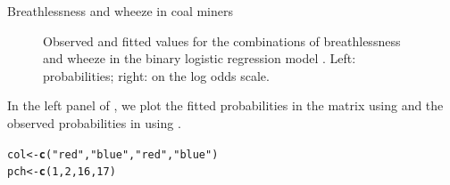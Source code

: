 \documentclass[11pt]{book}\usepackage[]{graphicx}\usepackage[]{color}
\makeatletter
\newcommand{\hlnum}[1]{\textcolor[rgb]{0.686,0.059,0.569}{#1}}%
\newcommand{\hlstr}[1]{\textcolor[rgb]{0.192,0.494,0.8}{#1}}%
\newcommand{\hlstd}[1]{\textcolor[rgb]{0.345,0.345,0.345}{#1}}%
\newcommand{\hlkwb}[1]{\textcolor[rgb]{0.69,0.353,0.396}{#1}}%
\newcommand{\hlkwd}[1]{\textcolor[rgb]{0.737,0.353,0.396}{\textbf{#1}}}%
\newenvironment{kframe}{%
 \def\at@end@of@kframe{}%
 \ifinner\ifhmode%
  \def\at@end@of@kframe{\end{minipage}}%
  \begin{minipage}{\columnwidth}%
 \fi\fi%
 \def\FrameCommand##1{\hskip\@totalleftmargin \hskip-\fboxsep
 \colorbox{shadecolor}{##1}\hskip-\fboxsep
     \hskip-\linewidth \hskip-\@totalleftmargin \hskip\columnwidth}%
 \MakeFramed {\advance\hsize-\width
   \@totalleftmargin\z@ \linewidth\hsize
   \@setminipage}}%
 {\par\unskip\endMakeFramed%
 \at@end@of@kframe}
\newenvironment{knitrout}{}{} %
\renewenvironment{knitrout}{\small\renewcommand{\baselinestretch}{.85}}{} %
\makeatother
\begin{document}
\begin{Example}[coalminers]{Breathlessness and wheeze in coal miners}
\begin{figure}
\caption{Observed and fitted values for the combinations of breathlessness and wheeze in the binary logistic regression model . Left: probabilities; right: on the log odds scale.}
\label{fig:cm-vglm1}
\end{figure}

In the left panel of , we plot the fitted probabilities in the matrix
 using  and the observed probabilities in  using .

\begin{knitrout}
\color{fgcolor}\begin{kframe}
\begin{alltt}
\hlstd{col} \hlkwb{<-} \hlkwd{c}\hlstd{(}\hlstr{"red"}\hlstd{,} \hlstr{"blue"}\hlstd{,} \hlstr{"red"}\hlstd{,} \hlstr{"blue"}\hlstd{)}
\hlstd{pch} \hlkwb{<-} \hlkwd{c}\hlstd{(}\hlnum{1}\hlstd{,}\hlnum{2}\hlstd{,}\hlnum{16}\hlstd{,}\hlnum{17}\hlstd{)}


\end{alltt}
\end{kframe}
\end{knitrout}
\end{Example}
\end{document}
